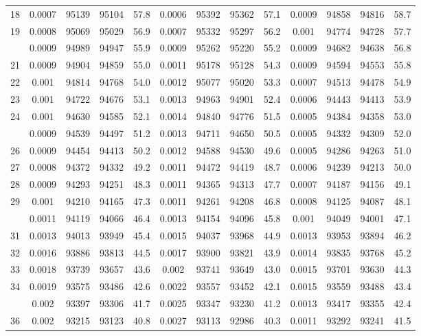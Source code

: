 \documentclass[
  14pt,
]{article}
\begin{document}
\begin{longtable}[t]{lcccccccccccc}
18 & 0.0007 & 95139 & 95104 & 57.8 & 0.0006 & 95392 & 95362 & 57.1 & 0.0009 & 94858 & 94816 & 58.7\\
19 & 0.0008 & 95069 & 95029 & 56.9 & 0.0007 & 95332 & 95297 & 56.2 & 0.001 & 94774 & 94728 & 57.7\\
\addlinespace
20 & 0.0009 & 94989 & 94947 & 55.9 & 0.0009 & 95262 & 95220 & 55.2 & 0.0009 & 94682 & 94638 & 56.8\\
21 & 0.0009 & 94904 & 94859 & 55.0 & 0.0011 & 95178 & 95128 & 54.3 & 0.0009 & 94594 & 94553 & 55.8\\
22 & 0.001 & 94814 & 94768 & 54.0 & 0.0012 & 95077 & 95020 & 53.3 & 0.0007 & 94513 & 94478 & 54.9\\
23 & 0.001 & 94722 & 94676 & 53.1 & 0.0013 & 94963 & 94901 & 52.4 & 0.0006 & 94443 & 94413 & 53.9\\
24 & 0.001 & 94630 & 94585 & 52.1 & 0.0014 & 94840 & 94776 & 51.5 & 0.0005 & 94384 & 94358 & 53.0\\
\addlinespace
25 & 0.0009 & 94539 & 94497 & 51.2 & 0.0013 & 94711 & 94650 & 50.5 & 0.0005 & 94332 & 94309 & 52.0\\
26 & 0.0009 & 94454 & 94413 & 50.2 & 0.0012 & 94588 & 94530 & 49.6 & 0.0005 & 94286 & 94263 & 51.0\\
27 & 0.0008 & 94372 & 94332 & 49.2 & 0.0011 & 94472 & 94419 & 48.7 & 0.0006 & 94239 & 94213 & 50.0\\
28 & 0.0009 & 94293 & 94251 & 48.3 & 0.0011 & 94365 & 94313 & 47.7 & 0.0007 & 94187 & 94156 & 49.1\\
29 & 0.001 & 94210 & 94165 & 47.3 & 0.0011 & 94261 & 94208 & 46.8 & 0.0008 & 94125 & 94087 & 48.1\\
\addlinespace
30 & 0.0011 & 94119 & 94066 & 46.4 & 0.0013 & 94154 & 94096 & 45.8 & 0.001 & 94049 & 94001 & 47.1\\
31 & 0.0013 & 94013 & 93949 & 45.4 & 0.0015 & 94037 & 93968 & 44.9 & 0.0013 & 93953 & 93894 & 46.2\\
32 & 0.0016 & 93886 & 93813 & 44.5 & 0.0017 & 93900 & 93821 & 43.9 & 0.0014 & 93835 & 93768 & 45.2\\
33 & 0.0018 & 93739 & 93657 & 43.6 & 0.002 & 93741 & 93649 & 43.0 & 0.0015 & 93701 & 93630 & 44.3\\
34 & 0.0019 & 93575 & 93486 & 42.6 & 0.0022 & 93557 & 93452 & 42.1 & 0.0015 & 93559 & 93488 & 43.4\\
\addlinespace
35 & 0.002 & 93397 & 93306 & 41.7 & 0.0025 & 93347 & 93230 & 41.2 & 0.0013 & 93417 & 93355 & 42.4\\
36 & 0.002 & 93215 & 93123 & 40.8 & 0.0027 & 93113 & 92986 & 40.3 & 0.0011 & 93292 & 93241 & 41.5\\

\end{longtable}
\end{document}
